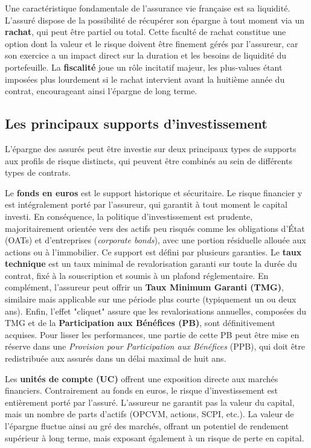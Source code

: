 \bigskip

Une caractéristique fondamentale de l'assurance vie française est sa liquidité. L'assuré dispose de la possibilité de récupérer son épargne à tout moment via un \textbf{rachat}, qui peut être partiel ou total. Cette faculté de rachat constitue une option dont la valeur et le risque doivent être finement gérés par l'assureur, car son exercice a un impact direct sur la duration et les besoins de liquidité du portefeuille. La \textbf{fiscalité} joue un rôle incitatif majeur, les plus-values étant imposées plus lourdement si le rachat intervient avant la huitième année du contrat, encourageant ainsi l'épargne de long terme.

\subsection{Les principaux supports d'investissement}

L'épargne des assurés peut être investie sur deux principaux types de supports aux profils de risque distincts, qui peuvent être combinés au sein de différents types de contrats.

\bigskip

Le \textbf{fonds en euros} est le support historique et sécuritaire. Le risque financier y est intégralement porté par l'assureur, qui garantit à tout moment le capital investi. En conséquence, la politique d'investissement est prudente, majoritairement orientée vers des actifs peu risqués comme les obligations d'État (OATs) et d'entreprises (\textit{corporate bonds}), avec une portion résiduelle allouée aux actions ou à l'immobilier. Ce support est défini par plusieurs garanties. Le \textbf{taux technique} est un taux minimal de revalorisation garanti sur toute la durée du contrat, fixé à la souscription et soumis à un plafond réglementaire. En complément, l'assureur peut offrir un \textbf{Taux Minimum Garanti (TMG)}, similaire mais applicable sur une période plus courte (typiquement un ou deux ans). Enfin, l'effet "cliquet" assure que les revalorisations annuelles, composées du TMG et de la \textbf{Participation aux Bénéfices (PB)}, sont définitivement acquises. Pour lisser les performances, une partie de cette PB peut être mise en réserve dans une \textit{Provision pour Participation aux Bénéfices} (PPB), qui doit être redistribuée aux assurés dans un délai maximal de huit ans.

\bigskip

Les \textbf{unités de compte (UC)} offrent une exposition directe aux marchés financiers. Contrairement au fonds en euros, le risque d'investissement est entièrement porté par l'assuré. L'assureur ne garantit pas la valeur du capital, mais un nombre de parts d'actifs (OPCVM, actions, SCPI, etc.). La valeur de l'épargne fluctue ainsi au gré des marchés, offrant un potentiel de rendement supérieur à long terme, mais exposant également à un risque de perte en capital.


